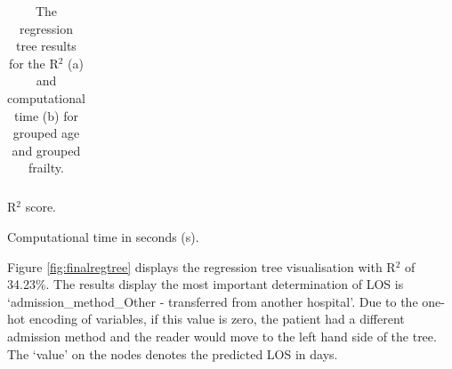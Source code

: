 \documentclass[../thesis.tex]{subfiles}
\begin{document}
\begin{landscape}
\begin{table}[h!]
\begin{subtable}{.45\linewidth}
{\begin{tabular}{@{}cccccccc@{}}
    \end{tabular}}
    \caption{R$^{2}$ score.}
    \label{tab:regtree6a}
    \end{subtable}
\begin{subtable}{.45\linewidth}

    
    \centering{}
    \caption{Computational time in seconds (s).}
    \label{tab:regtree6c}

\end{subtable}
\label{tab:regtree6}
\caption{The regression tree results for the R$^{2}$ (a) and computational time (b) for grouped age and grouped frailty.}
\end{table}

\end{landscape}

Figure \ref{fig:finalregtree} displays the regression tree visualisation with R$^{2}$ of 34.23\%. The results display the most important determination of LOS is `admission\_method\_Other - transferred from another hospital'. Due to the one-hot encoding of variables, if this value is zero, the patient had a different admission method and the reader would move to the left hand side of the tree. The `value' on the nodes denotes the predicted LOS in days.
\end{document}
